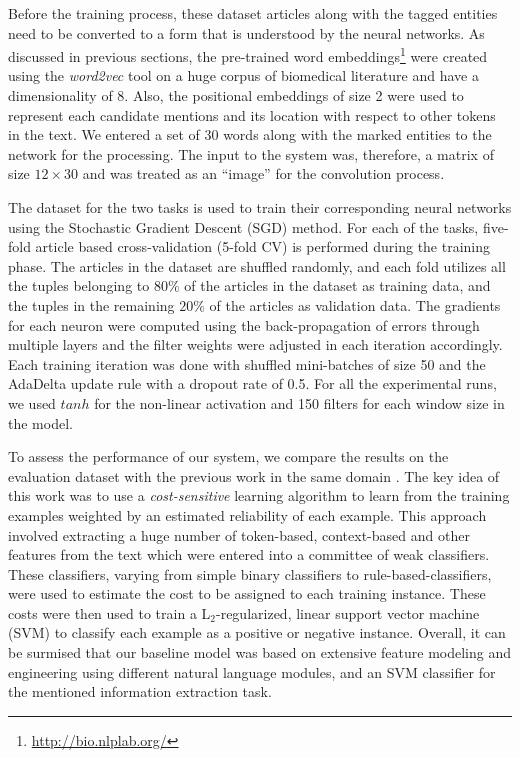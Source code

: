 Before the training process, these dataset articles along with the tagged entities need to be converted to a form that is understood by the neural networks. As discussed in previous sections, the pre-trained word embeddings\footnote{\url{http://bio.nlplab.org/}} \cite{pyysalo2013distributional} were created using the \emph{word2vec} tool on a huge corpus of biomedical literature and have a dimensionality of 8. Also, the positional embeddings of size 2 were used to represent each candidate mentions and its location with respect to other tokens in the text. We entered a set of 30 words along with the marked entities to the network for the processing. The input to the system was, therefore, a matrix of size $12 \times 30$ and was treated as an ``image'' for the convolution process.

The dataset for the two tasks is used to train their corresponding neural networks using the Stochastic Gradient Descent (SGD) method. For each of the tasks, five-fold article based cross-validation (5-fold CV) is performed during the training phase. The articles in the dataset are shuffled randomly, and each fold utilizes all the tuples belonging to $80\%$ of the articles in the dataset as training data, and the tuples in the remaining $20\%$ of the articles as validation data. The gradients for each neuron were computed using the back-propagation of errors through multiple layers and the filter weights were adjusted in each iteration accordingly. Each training iteration was done with shuffled mini-batches of size 50 and the AdaDelta update rule \cite{zeiler2012adadelta} with a dropout rate of 0.5. For all the experimental runs, we used $tanh$ for the non-linear activation and 150 filters for each window size in the model. 

To assess the performance of our system, we compare the results on the evaluation dataset with the previous work in the same domain \cite{kashyapthesis}. The key idea of this work was to use a {\it cost-sensitive} learning algorithm to learn from the training examples weighted by an estimated reliability of each example. This approach involved extracting a huge number of token-based, context-based and other features from the text which were entered into a committee of weak classifiers. These classifiers, varying from simple binary classifiers to rule-based-classifiers, were used to estimate the cost to be assigned to each training instance. These costs were then used to train a L$_{2}$-regularized, linear support vector machine (SVM) to classify each example as a positive or negative instance. Overall, it can be surmised that our baseline model was based on extensive feature modeling and engineering using different natural language modules, and an SVM classifier for the mentioned information extraction task.

